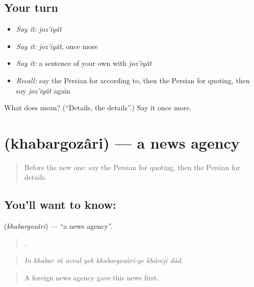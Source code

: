 \subsection*{Your turn}
\begin{itemize}
\raggedright
  \item \emph{Say it:} \emph{joz'iyât}
  \item \emph{Say it:} \emph{joz'iyât}, once more
  \item \emph{Say it:} a sentence of your own with \emph{joz'iyât}
  \item \emph{Recall:} say the Persian for according to, then the Persian for quoting, then say \emph{joz'iyât} again
\end{itemize}

\begin{tcolorbox}[breakable,colback=teal!4,colframe=teal!35!black,title={Before you move on}]
What does  mean? (\textquotedblleft{}Details, the details\textquotedblright{}.) Say it once more.
\end{tcolorbox}
\section[\texorpdfstring{\fa{خبرگزاری} (khabargozâri)}{خبرگزاری (khabargozâri)}]{ (khabargozâri) — a news agency}

\label{lesson:FA-C311-khabargozari}



\begin{quote}
Before the new one: say the Persian for quoting, then the Persian for details.
\end{quote}

\subsection*{You'll want to know: }
\textbf{} (\emph{khabargozâri}) — \textquotedblleft{}a news agency\textquotedblright{}.

\begin{quote}
       .
\end{quote}

\begin{quote}
\emph{In khabar râ avval yek khabargozâri-ye khâreji dâd.}
\end{quote}

\begin{quote}
A foreign news agency gave this news first.
\end{quote}

